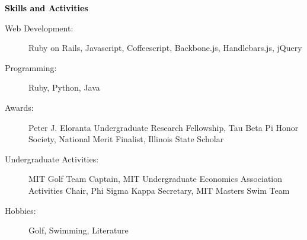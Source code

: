 \documentclass[letterpaper,11pt]{article}
\makeatletter
\newcommand{\resheading}[1]{{\large \colorbox{mygrey}{\begin{minipage}{\textwidth}{\textbf{ \textcolor{Black}{#1 \vphantom{p\^{E}}}}}\end{minipage}}}}
\newcommand{\ressubheading}[4]{
\begin{tabular*}{6.5in}{l@{\extracolsep{\fill}}r}
		\textbf{#1} & #2 \\
		\textit{#3} & \textit{#4} \\
\end{tabular*}\vspace{-6pt}}
\makeatother
\begin{document}
\begin{comment}
\resheading{Presentations and Lectures}
	\begin{itemize}
		\item
			\ressubheading{Rose Hulman Undergraduate Math Conference}{Terre Haute, IN}{Student Speaker}{Mar. 2008 and Mar. 2009}
			{\footnotesize
			\begin{itemize}
				\item 2009 Presentation: "A Model of Semi-Rational Behavior in Asset Markets"
				\item 2008 Presentation: "The Black-White Achievement Gap: A Static State Intergenerational Model"
			\end{itemize}
			}
		\item
			\ressubheading{IMSAloquim}{Aurora, IL}{Student Speaker}{Apr. 2009}
			{ \footnotesize
			\begin{itemize}
				\item "School Structure and Academic Achievement"
			\end{itemize}
			}
	\end{itemize}
\end{comment}

\resheading{Skills and Activities}
	\begin{description}
		\item[Web Development:] {Ruby on Rails}, {Javascript}, {Coffeescript}, {Backbone.js}, {Handlebars.js}, {jQuery}
		\vspace{-5pt}
		\item[Programming:] {Ruby}, {Python}, {Java}
		\vspace{-5pt}
		\item[Awards:] {Peter J. Eloranta Undergraduate Research Fellowship}, {Tau Beta Pi Honor Society}, {National Merit Finalist}, {Illinois State Scholar}
		\vspace{-5pt}
		\item[Undergraduate Activities:] {MIT Golf Team Captain}, {MIT Undergraduate Economics Association Activities Chair}, {Phi Sigma Kappa Secretary}, {MIT Masters Swim Team}
		\vspace{-5pt}
		\item[Hobbies:]{Golf}, {Swimming}, {Literature}  

	\end{description} %
\end{document}
